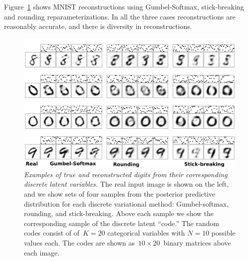    

Figure~\ref{fig:VAE} shows MNIST reconstructions using Gumbel-Softmax,
stick-breaking and rounding reparameterizations. In all the three
cases reconstructions are reasonably accurate, and there is diversity
in reconstructions.
\begin{figure}[t]
  \centering
  \includegraphics[width=5.in]{../figures/figure4.pdf} 
  \caption{\textit{Examples of true and reconstructed digits from their
    corresponding discrete latent variables.} The real input image is
    shown on the left, and we show sets of four samples from the
    posterior predictive distribution for each discrete variational
    method: Gumbel-softmax, rounding, and stick-breaking.  Above each
    sample we show the corresponding sample of the discrete latent
    ``code.''  The random codes consist of of~$K=20$ categorical
    variables with $N=10$ possible values each.  The codes are shown
    as~${10 \times 20}$~binary matrices above each image.}
\label{fig:VAE}
\end{figure}


